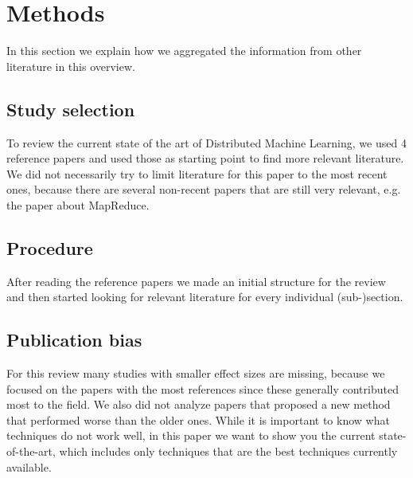 \section{Methods}
In this section we explain how we aggregated the information from other literature in this overview.

\subsection{Study selection}
To review the current state of the art of Distributed Machine Learning, we used 4 reference papers\cite{Bal12}\cite{Die12}\cite{Xing16}\cite{Zhang16} and used those as starting point to find more relevant literature. We did not necessarily try to limit literature for this paper to the most recent ones, because there are several non-recent papers that are still very relevant, e.g. the paper about MapReduce\cite{Dean04}.
\subsection{Procedure}
After reading the reference papers \cite{Bal12}\cite{Die12}\cite{Xing16}\cite{Zhang16} we made an initial structure for the review and then started looking for relevant literature for every individual (sub-)section.
\subsection{Publication bias}
For this review many studies with smaller effect sizes are missing, because we focused on the papers with the most references since these generally contributed most to the field. We also did not analyze papers that proposed a new method that performed worse than the older ones. While it is important to know what techniques do not work well, in this paper we want to show you the current state-of-the-art, which includes only techniques that are the best techniques currently available.